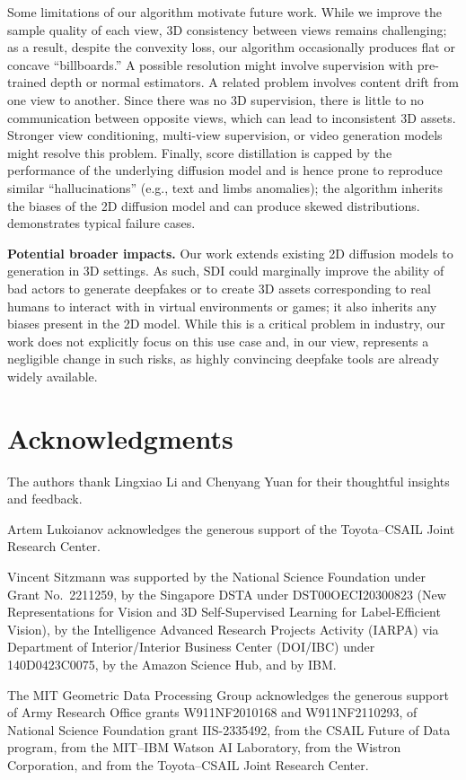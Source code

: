 \documentclass{article}
\begin{document}
Some limitations of our algorithm motivate future work.
While we improve the sample quality of each view, 3D consistency between views remains challenging; as a result, despite the  convexity loss, our algorithm occasionally produces flat or concave ``billboards.'' %
A possible resolution might involve supervision with pre-trained depth or normal estimators.
A related problem involves content drift from one view to another.
Since there was no 3D supervision, there is little to no communication between opposite views, which can lead to inconsistent 3D assets.
Stronger view conditioning, multi-view supervision, or video generation models might resolve this problem.
Finally, score distillation is capped by the performance of the underlying diffusion model and is hence prone to  reproduce similar ``hallucinations'' (e.g., text and limbs anomalies); the algorithm inherits the biases of the 2D diffusion model and can produce skewed distributions.
 demonstrates typical failure cases.

\textbf{Potential broader impacts.} Our work extends existing 2D diffusion models to generation in 3D settings. As such, SDI could marginally improve the ability of bad actors to generate deepfakes or to create 3D assets corresponding to real humans to interact with in virtual environments or games; it also inherits any biases present in the 2D model. While this is a critical problem in industry, our work does not explicitly focus on this use case and, in our view, represents a negligible change in such risks, as highly convincing deepfake tools are already widely available.

\section*{Acknowledgments}

The authors thank Lingxiao Li and Chenyang Yuan for their thoughtful insights and feedback.

Artem Lukoianov acknowledges the generous support of the Toyota–CSAIL Joint Research Center.

Vincent Sitzmann was supported by the National Science Foundation under Grant No.\ 2211259, by the Singapore DSTA under DST00OECI20300823 (New Representations for Vision and 3D Self-Supervised Learning for Label-Efficient Vision), by the Intelligence Advanced Research Projects Activity (IARPA) via Department of Interior/Interior Business Center (DOI/IBC) under 140D0423C0075, by the Amazon Science Hub, and by IBM.

The MIT Geometric Data Processing Group acknowledges the generous support of  Army Research Office grants W911NF2010168 and W911NF2110293, of National Science Foundation grant IIS-2335492, from the CSAIL Future of Data program, from the MIT–IBM Watson AI Laboratory, from the Wistron Corporation, and from the Toyota–CSAIL Joint Research Center.


\newpage
\printbibliography



% 
\end{document}
